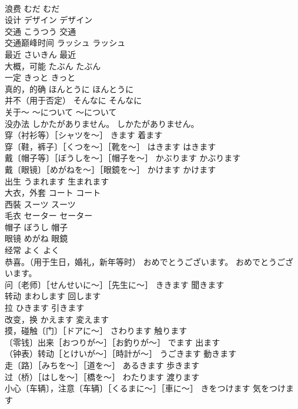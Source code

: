 \documentclass[8pt]{extreport}
\begin{document}
\begin{CJK}{UTF8}{min}
\\	浪费	むだ	むだ
\\	设计	デザイン	デザイン
\\	交通	こうつう	交通
\\	交通巅峰时间	ラッシュ	ラッシュ
\\	最近	さいきん	最近
\\	大概，可能	たぶん	たぶん
\\	一定	きっと	きっと
\\	真的，的确	ほんとうに	ほんとうに
\\	并不（用于否定）	そんなに	そんなに
\\	关于～	～について	～について
\\	没办法	しかたがありません。	しかたがありません。
\\	穿（衬衫等）［シャツを～］	きます	着ます
\\	穿〔鞋，裤子〕［くつを～］［靴を～］	はきます	はきます
\\	戴〔帽子等〕［ぼうしを～］［帽子を～］	かぶります	かぶります
\\	戴〔眼镜〕［めがねを～］［眼鏡を～］	かけます	かけます
\\	出生	うまれます	生まれます
\\	大衣，外套	コート	コート
\\	西裝	スーツ	スーツ
\\	毛衣	セーター	セーター
\\	帽子	ぼうし	帽子
\\	眼镜	めがね	眼鏡
\\	经常	よく	よく
\\	恭喜。（用于生日，婚礼，新年等时）	おめでとうございます。	おめでとうございます。
\\	问〔老师〕［せんせいに～］［先生に～］	ききます	聞きます
\\	转动	まわします	回します
\\	拉	ひきます	引きます
\\	改变，换	かえます	変えます
\\	摸，碰触〔门〕［ドアに～］	さわります	触ります
\\	〔零钱〕出来［おつりが～］［お釣りが～］	でます	出ます
\\	（钟表）转动［とけいが～］［時計が～］	うごきます	動きます
\\	走〔路〕［みちを～］［道を～］	あるきます	歩きます
\\	过（桥）［はしを～］［橋を～］	わたります	渡ります
\\	小心〔车辆〕，注意〔车辆〕［くるまに～］［車に～］	きをつけます	気をつけます

\end{CJK}
\end{document}
